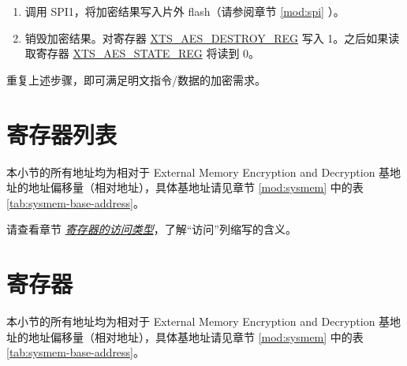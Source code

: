 \documentclass[main\_\_CN.tex]{subfiles}
\begin{document}
\begin{enumerate}
    \item 调用 SPI1，将加密结果写入片外 flash（请参阅章节 \ref{mod:spi} \textit{}）。

    \item 销毁加密结果。对寄存器 \hyperref[regdesc:XTSAESDESTROYREG]{XTS\_AES\_DESTROY\_REG} 写入 1。之后如果读取寄存器 \hyperref[regdesc:XTSAESSTATEREG]{XTS\_AES\_STATE\_REG} 将读到 0。

\end{enumerate}

重复上述步骤，即可满足明文指令/数据的加密需求。



\clearpage
\section{寄存器列表}
\label{sec:extmemencr-reg-summ}
\hypertarget{extmemencr-reg-summ}{}

本小节的所有地址均为相对于 External Memory Encryption and Decryption 基地址的地址偏移量（相对地址），具体基地址请见章节 \ref{mod:sysmem} \textit{} 中的表 \ref{tab:sysmem-base-address}。

请查看章节 \hyperref[glossary-access-types]{\textit{寄存器的访问类型}}，了解“访问”列缩写的含义。






\clearpage
\section{寄存器}

本小节的所有地址均为相对于 External Memory Encryption and Decryption 基地址的地址偏移量（相对地址），具体基地址请见章节 \ref{mod:sysmem} \textit{} 中的表 \ref{tab:sysmem-base-address}。


\end{document}
